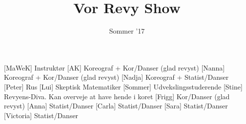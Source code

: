 \documentclass[a4paper,11pt]{article}
\title{Vor Revy Show}
\author{Sommer '17}
\begin{document}
\maketitle

\begin{roles}
[MaWeK] Instruktør
[AK] Koreograf + Kor/Danser (glad revyst)
[Nanna] Koreograf + Kor/Danser (glad revyst)
[Nadja] Koreograf + Statist/Danser
[Peter] Rus
[Lui] Skeptisk Matematiker
[Sommer] Udvekslingsstuderende
[Stine] Revyens-Diva. Kan overveje at have hende i koret
[Frigg] Kor/Danser (glad revyst)
[Anna] Statist/Danser
[Carla] Statist/Danser
[Sara] Statist/Danser
[Victoria] Statist/Danser
\end{roles}

\end{document}
